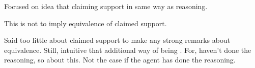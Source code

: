 \begin{note}
  Focused on idea that claiming support in same way as reasoning.

  This is not to imply equivalence of claimed support.

  Said too little about claimed support to make any strong remarks about equivalence.
  Still, intuitive that additional way of being \mom{}.
  For, haven't done the reasoning, so \mom{} about this.
  Not the case if the agent has done the reasoning.
\end{note}



